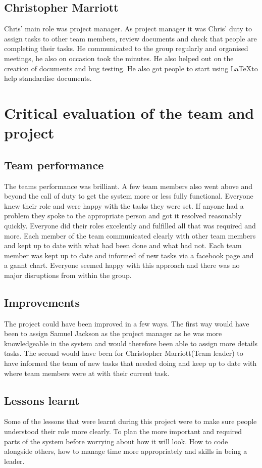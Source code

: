 \documentclass{project}
\begin{document}
\subsection{Christopher Marriott}
Chris' main role was project manager. As project manager it was Chris' duty to assign tasks to other team members, review documents and check that people are completing their tasks. He communicated to the group regularly and organised meetings, he also on occasion took the minutes. He also helped out on the creation of documents and bug testing. He also got people to start using \LaTeX to help standardise documents.

\section{Critical evaluation of the team and project}
\subsection{Team performance}
The teams performance was brilliant. A few team members also went above and beyond the call of duty to get the system more or less fully functional. Everyone knew their role and were happy with the tasks they were set. If anyone had a problem they spoke to the appropriate person and got it resolved reasonably quickly. Everyone did their roles excelently and fulfilled all that was required and more. Each member of the team communicated clearly with other team members and kept up to date with what had been done and what had not. Each team member was kept up to date and informed of new tasks via a facebook page and a gannt chart. Everyone seemed happy with this approach and there was no major disruptions from within the group.

\subsection{Improvements}
The project could have been improved in a few ways. The first way would have been to assign Samuel Jackson as the project manager as he was more knowledgeable in the system and would therefore been able to assign more details tasks. The second would have been for Christopher Marriott(Team leader) to have informed the team of new tasks that needed doing and keep up to date with where team members were at with their current task.

\subsection{Lessons learnt}
Some of the lessons that were learnt during this project were to make sure people understood their role more clearly. To plan the more important and required parts of the system before worrying about how it will look. How to code alongside others, how to manage time more appropriately and skills in being a leader.
\end{document}
